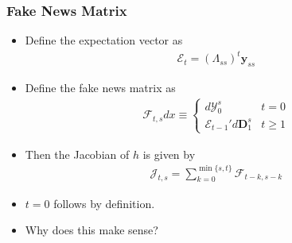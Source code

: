\documentclass[english,xcolor=svgnames]{beamer}
\begin{document}
\begin{frame}
    \frametitle{Fake News Matrix}
    \begin{itemize}
        \item Define the expectation vector as
        \begin{align*}
            \mathcal{E}_t =  (\Lambda_{ss})^{t}\bm{y}_{ss}
        \end{align*}
    	\item Define the fake news matrix as
    	\begin{align*}
    		\mathcal{F}_{t,s}dx \equiv \begin{cases}
    			d\mathcal{Y}_0^s & t=0 \\
    			\mathcal{E}_{t-1}' d\bm{D}_1^s & t\ge 1
    		\end{cases}
    	\end{align*}
        \item Then the Jacobian of $h$ is given by
        \begin{align*}
        	\mathcal{J}_{t,s} = \sum_{k=0}^{\min\{s,t\}}\mathcal{F}_{t-k,s-k}
        \end{align*}
        \item $t=0$ follows by definition.
        \item Why does this make sense?
	\end{itemize}
\end{frame}
\end{document}
